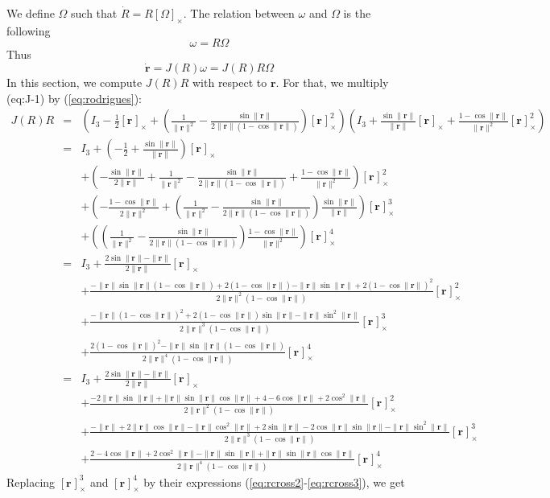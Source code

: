\documentclass {article}
\newcommand\rot{\mathbf{r}}
\newcommand\rcross[1]{[\rot_{#1}]_{\times}}
\newcommand\normr{\|\rot\|}
\begin{document}
We define $\Omega$ such that $\dot{R} = R \left[\Omega\right]_{\times}$. The relation
between $\omega$ and $\Omega$ is the following
$$
  \omega = R\Omega
$$
Thus
$$
\dot{\rot} = J (R) \omega = J (R) R \Omega
$$
In this section, we compute $J(R)R$ with respect to $\rot$. For that, we
multiply ({eq:J-1}) by (\ref{eq:rodrigues}):
\begin {eqnarray*}
J(R)R &=& (I_3 -\frac{1}{2}\rcross{} +  \left(\frac{1}{\normr^2} - \frac{\sin\normr}{2\normr(1-\cos\normr)}\right)\rcross{}^2)(I_3 + \frac{\sin \normr}{\normr}\rcross{} +
\frac{1 - \cos \normr}{\normr^2}\rcross{}^2)\\
&=& I_3 + \left(-\frac{1}{2} + \frac{\sin \normr}{\normr}\right)\rcross{} \\
&& + \left(-\frac{\sin \normr}{2\normr}+\frac{1}{\normr^2} - \frac{\sin\normr}{2\normr(1-\cos\normr)}+\frac{1 - \cos \normr}{\normr^2}\right)\rcross{}^2\\
&& + \left(-\frac{1 - \cos \normr}{2\normr^2} + (\frac{1}{\normr^2} - \frac{\sin\normr}{2\normr(1-\cos\normr)})\frac{\sin \normr}{\normr}\right)\rcross{}^3\\
&& + \left((\frac{1}{\normr^2} - \frac{\sin\normr}{2\normr(1-\cos\normr)})\frac{1 - \cos \normr}{\normr^2}\right)\rcross{}^4\\
&=& I_3 + \frac{2\sin\normr-\normr}{2\normr}\rcross{}\\
&& + \frac{-\normr\sin\normr(1-\cos\normr)+2(1-\cos\normr)-\normr\sin\normr+2(1-\cos\normr)^2}{2\normr^2(1-\cos\normr)}\rcross{}^2\\
&&+ \frac{-\normr(1-\cos\normr)^2 + 2(1-\cos\normr)\sin\normr - \normr\sin^2\normr}{2\normr^3(1-\cos\normr)} \rcross{}^3 \\
&&+ \frac{2(1-\cos\normr)^2-\normr\sin\normr(1-\cos\normr)}{2\normr^4(1-\cos\normr)} \rcross{}^4\\
&=& I_3 + \frac{2\sin\normr-\normr}{2\normr}\rcross{}\\
&& + \frac{-2\normr\sin\normr+\normr\sin\normr\cos\normr+4-6\cos\normr+2\cos^2\normr}{2\normr^2(1-\cos\normr)}\rcross{}^2\\
&&+ \frac{-\normr+2\normr\cos\normr-\normr\cos^2\normr + 2\sin\normr-2\cos\normr\sin\normr - \normr\sin^2\normr}{2\normr^3(1-\cos\normr)} \rcross{}^3 \\
&&+ \frac{2-4\cos\normr+2\cos^2\normr-\normr\sin\normr+\normr\sin\normr\cos\normr}{2\normr^4(1-\cos\normr)} \rcross{}^4
\end{eqnarray*}
Replacing $\rcross{}^3$ and $\rcross{}^4$ by their expressions (\ref{eq:rcross2}-\ref{eq:rcross3}), we get
\end{document}
